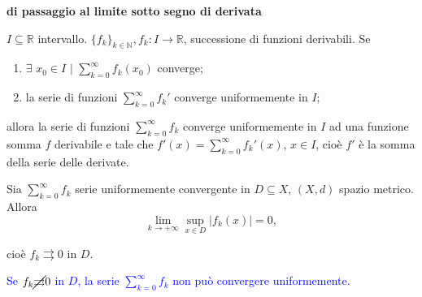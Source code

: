 \begin{theorem} \textbf{di passaggio al limite sotto segno di derivata}
	
	$I \subseteq \mathbb{R}$ intervallo. $\{f_k\}_{k \in \mathbb{N}}, f_k: I \rightarrow \mathbb{R}$, successione di funzioni derivabili. Se 
	\begin{enumerate}
		\item $\exists\,\, x_0\in I \,\, \big|$ $\sum_{k=0}^{\infty}f_k(x_0)$ converge;
		
		\item la serie di funzioni $\sum_{k=0}^{\infty}f_k'$ converge uniformemente in $I$;
	\end{enumerate}
	
	allora la serie di funzioni $\sum_{k=0}^{\infty}f_k$ converge uniformemente in $I$ ad una funzione somma $f$ derivabile e tale che $f'(x)= \sum_{k=0}^{\infty}f_k'(x)$, $x \in I$, cioè $f'$ è la somma della serie delle derivate.
	
\end{theorem}


\begin{proposition}
	\label{pr: pag 260}
	Sia $\sum_{k=0}^{\infty} f_k$ serie uniformemente convergente in $D \subseteq X$, $(X,d)$ spazio metrico. Allora 
	\begin{equation*}
		\lim_{k\rightarrow+\infty}\sup_{x \in D} |f_k(x)|=0,
	\end{equation*}
	
	cioè $f_k \rightrightarrows 0$ in $D$.
	
	\textcolor{blue}{Se $f_k \cancel{\rightrightarrows} 0$ in $D$, la serie $\sum_{k=0}^{\infty}f_k$ non può convergere uniformemente.}
\end{proposition}


